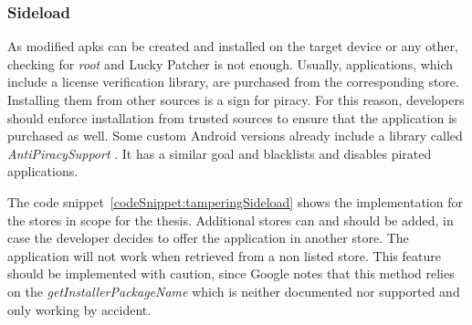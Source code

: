 \subsubsection{Sideload} \label{subsection:counter-improve-tampering-sideload}
As modified \gls{apk}s can be created and installed on the target device or any other, checking for \textit{root} and Lucky Patcher is not enough.
Usually, applications, which include a license verification library, are purchased from the corresponding store.
Installing them from other sources is a sign for piracy.
For this reason, developers should enforce installation from trusted sources to ensure that the application is purchased as well.
Some custom Android versions already include a library called \textit{AntiPiracySupport} \cite{antipiracy}.
It has a similar goal and blacklists and disables pirated applications.
\newline

The code snippet~\ref{codeSnippet:tamperingSideload} shows the implementation for the stores in scope for the thesis.
Additional stores can and should be added, in case the developer decides to offer the application in another store.
The application will not work when retrieved from a non listed store.
\newline
This feature should be implemented with caution, since Google notes that this method relies on the \textit{getInstallerPackageName} which is neither documented nor supported and \grqq only working by accident\grqq \cite{developersSecuring}.
